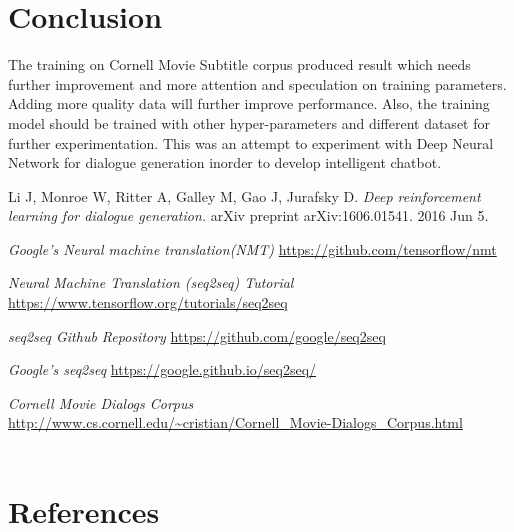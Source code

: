 \documentclass[a4paper,12pt]{report}
\begin{document}
{\let\clearpage\relax \chapter {Conclusion}}
\noindent The training on Cornell Movie Subtitle corpus produced result which needs further improvement and more attention and speculation on training parameters. Adding more quality data will further improve performance. Also, the training model should be trained with other hyper-parameters and different dataset for further experimentation. This was an attempt to experiment with Deep Neural Network for dialogue generation inorder to develop intelligent chatbot. 
\begin{thebibliography}{}
Li J, Monroe W, Ritter A, Galley M, Gao J, Jurafsky D.
\textit{Deep reinforcement learning for dialogue generation.} 
arXiv preprint arXiv:1606.01541. 2016 Jun 5.

\textit{Google's Neural machine translation(NMT)} 
\url{https://github.com/tensorflow/nmt}

\textit{Neural Machine Translation (seq2seq) Tutorial} 
\url{https://www.tensorflow.org/tutorials/seq2seq}

\textit{seq2seq Github Repository} 
\url{https://github.com/google/seq2seq}


\textit{Google's seq2seq} 
\url{https://google.github.io/seq2seq/}

\textit{Cornell Movie Dialogs Corpus}
\url{http://www.cs.cornell.edu/~cristian/Cornell_Movie-Dialogs_Corpus.html}\\\\

\end{thebibliography}
\newpage
{\let\clearpage\relax \chapter {References}}
\end{document}
